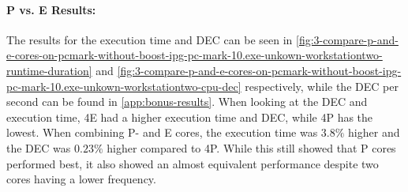 \paragraph{P vs. E Results:} The results for the execution time and DEC can be seen in  \cref{fig:3-compare-p-and-e-cores-on-pcmark-without-boost-ipg-pc-mark-10.exe-unkown-workstationtwo-runtime-duration} and  \cref{fig:3-compare-p-and-e-cores-on-pcmark-without-boost-ipg-pc-mark-10.exe-unkown-workstationtwo-cpu-dec} respectively, while the DEC per second can be found in \cref{app:bonus-results}. When looking at the DEC and execution time, 4E had a higher execution time and DEC, while 4P has the lowest. When combining P- and E cores, the execution time was $3.8\%$ higher and the DEC was $0.23\%$ higher compared to 4P. While this still showed that P cores performed best, it also showed an almost equivalent performance despite two cores having a lower frequency.



